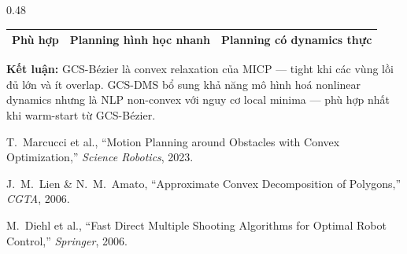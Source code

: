 \documentclass[final]{beamer}
\begin{document}
\begin{frame}[t]
\begin{columns}[t,totalwidth=\textwidth]
\begin{column}{0.48\textwidth}
\begin{center}
\begin{tabular}{@{}p{5cm}p{10cm}p{10cm}@{}}
          Phù hợp           & Planning hình học nhanh                 & Planning có dynamics thực    \\

          \bottomrule
        \end{tabular}
      \end{center}

      \vspace{0.5em}
      \begin{conclusionbox}
        \textbf{Kết luận:} GCS-Bézier là convex relaxation của MICP — tight khi các vùng lồi đủ lớn và ít overlap.
        GCS-DMS bổ sung khả năng mô hình hoá nonlinear dynamics nhưng là NLP non-convex với nguy cơ local minima
        — phù hợp nhất khi warm-start từ GCS-Bézier.
      \end{conclusionbox}

      \vspace{0.8em}
      \begin{refbox}
        \begin{enumerate}[label={[\arabic*]}, leftmargin=*, itemsep=2pt, topsep=3pt,
            labelsep=4pt]
          \small
          \item T.~Marcucci et al., ``Motion Planning around Obstacles with Convex
                Optimization,'' \textit{Science Robotics}, 2023.
          \item J.~M.~Lien \& N.~M.~Amato, ``Approximate Convex Decomposition of Polygons,''
                \textit{CGTA}, 2006.
          \item M.~Diehl et al., ``Fast Direct Multiple Shooting Algorithms for Optimal Robot
                Control,'' \textit{Springer}, 2006.
        \end{enumerate}
      \end{refbox}

    \end{column}
  \end{columns}
\end{frame}
\end{document}

